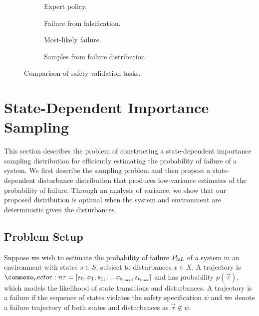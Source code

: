 \begin{figure}
    \centering
    \scriptsize
    \begin{subfigure}[b]{0.45\textwidth}
        \centering
        
        \caption{Expert policy.}
        \label{fig:dof_policy}
    \end{subfigure}
    \hfill
    \begin{subfigure}[b]{0.45\textwidth}
        \centering
        
        \caption{Failure from falsification.}
        \label{fig:dof_falsification}
    \end{subfigure}
    \par\medskip
    \begin{subfigure}[b]{0.45\textwidth}
        \centering
        
        \caption{Most-likely failure.}
        \label{fig:dof_mostlikely_failure}
    \end{subfigure}
    \hfill
    \begin{subfigure}[b]{0.45\textwidth}
        \centering
        
        \caption{Samples from failure distribution.}
        \label{fig:dof_dof}
    \end{subfigure}
    \caption{Comparison of safety validation tasks.}
    \label{fig:dof_comparison_safetytasks}
\end{figure}


\section{State-Dependent Importance Sampling}
This section describes the problem of constructing a state-dependent importance sampling distribution for efficiently estimating the probability of failure of a system. We first describe the sampling problem and then  propose a state-dependent disturbance distribution that produces low-variance estimates of the probability of failure. Through an analysis of variance, we show that our proposed distribution is optimal when the system and environment are deterministic given the disturbances.

\subsection{Problem Setup}
Suppose we wish to estimate the probability of failure $P_{\rm fail}$ of a system in an environment with states $s \in S$, subject to disturbances $x \in X$. A trajectory is $\vec{\tau} = [s_0, x_1, s_1, \ldots x_{t_{\rm max}}, s_{t_{\rm max}}]$ and has probability $p(\vec{\tau})$, which models the likelihood of state transitions and disturbances. A trajectory is a failure if the sequence of states violates the safety specification $\psi$ and we denote a failure trajectory of both states and disturbances as $\vec{\tau} \not \in \psi$. 

